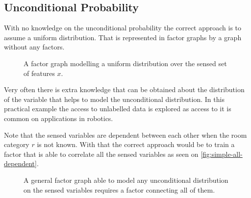 \subsection{Unconditional Probability}
\label{sec:sample-uncond-prob}
With no knowledge on the unconditional probability the correct approach is to
assume a uniform distribution.
That is represented in factor graphs by a graph without any factors.

\begin{figure}[h]
\centering
{}
\caption{\label{fig:simple-uniform-graph}A factor graph modelling a uniform
         distribution over the sensed set of features $x$.}
\end{figure}

Very often there is extra knowledge that can be obtained about the distribution
of the variable that helps to model the unconditional distribution.
In this practical example the access to unlabelled data is explored as access to
it is common on applications in robotics.

Note that the sensed variables are dependent between each other when the room
category $r$ is not known. With that the correct approach would be to train a
factor that is able to correlate all the sensed variables as seen on
\autoref{fig:simple-all-dependent}.

\begin{figure}[h]
\centering
{}
\caption{\label{fig:simple-all-dependent}A general factor graph able
         to model any unconditional distribution on the sensed variables
         requires a factor connecting all of them.}
\end{figure}

